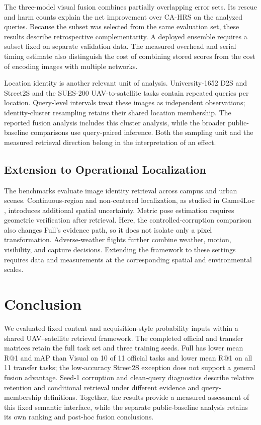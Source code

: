 \documentclass[journal]{IEEEtran}
\begin{document}
The three-model visual fusion combines partially overlapping error sets.
Its rescue and harm counts explain the net improvement over CA-HRS on the
analyzed queries. Because the subset was selected from the same evaluation
set, these results describe retrospective complementarity. A deployed
ensemble requires a subset fixed on separate validation data. The measured
overhead and serial timing estimate also distinguish the cost of combining
stored scores from the cost of encoding images with multiple networks.

Location identity is another relevant unit of analysis. University-1652
D2S and Street2S and the SUES-200 UAV-to-satellite tasks contain repeated
queries per location. Query-level intervals treat these images as
independent observations; identity-cluster resampling retains their shared
location membership. The reported fusion analysis includes this cluster
analysis, while the broader public-baseline comparisons use query-paired
inference. Both the sampling unit and the measured retrieval direction
belong in the interpretation of an effect.

\subsection{Extension to Operational Localization}

The benchmarks evaluate image identity retrieval across campus and urban
scenes. Continuous-region and non-centered localization, as studied in
Game4Loc \cite{game4loc2025}, introduces additional spatial uncertainty.
Metric pose estimation requires geometric verification after retrieval.
Here, the controlled-corruption comparison also changes Full's evidence
path, so it does not isolate only a pixel transformation. Adverse-weather
flights further combine weather, motion,
visibility, and capture decisions. Extending the framework to these
settings requires data and measurements at the corresponding spatial and
environmental scales.

\section{Conclusion}

We evaluated fixed content and acquisition-style probability inputs within
a shared UAV--satellite retrieval framework. The completed official and
transfer matrices retain the full task set and three training seeds. Full
has lower mean R@1 and mAP than Visual on 10 of 11 official tasks and lower
mean R@1 on all 11 transfer tasks; the low-accuracy Street2S exception does
not support a general fusion advantage. Seed-1 corruption and clean-query
diagnostics describe relative retention and conditional retrieval under
different evidence and query-membership definitions. Together, the results
provide a measured assessment of this fixed semantic interface, while the
separate public-baseline analysis retains its own ranking and post-hoc
fusion conclusions.

\FloatBarrier
\clearpage


\end{document}
